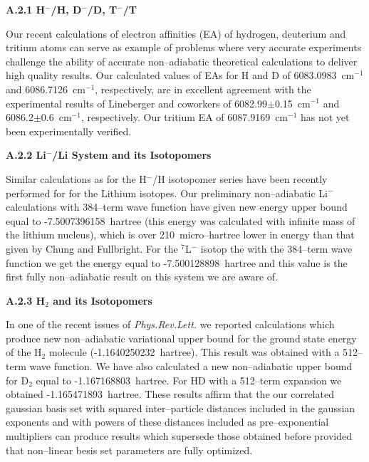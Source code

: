 \vspace{2mm}
{\bf A.2.1 H$^-$/H, D$^-$/D, T$^-$/T

Our recent calculations of electron affinities (EA) of hydrogen, deuterium
and tritium atoms \cite{A37} can serve as example of 
problems where very accurate experiments challenge the ability
of accurate non--adiabatic theoretical calculations 
to deliver high quality results.
Our calculated values of EAs for H and D of 6083.0983~cm$^{-1}$
and 6086.7126~cm$^{-1}$, respectively, are in excellent
agreement with the experimental results of Lineberger and
coworkers of 6082.99$\pm$0.15~cm$^{-1}$ and 6086.2$\pm$0.6~cm$^{-1}$,
respectively. Our tritium EA of 6087.9169~cm$^{-1}$ has not yet 
been experimentally verified. 


\vspace{2mm}
{\bf A.2.2 Li$^-$/Li System and its Isotopomers} 



Similar calculations as for the H$^-$/H isotopomer series
have been recently performed for  
for the Lithium isotopes.
Our preliminary non--adiabatic 
Li$^-$ calculations 
with 384--term wave function
have given new energy upper bound equal to
-7.5007396158~hartree (this energy was calculated
with infinite mass of the lithium nucleus), which is
over 210~micro--hartree lower in energy than that
given by Chung and Fullbright.\cite{Chung92} 
For the $^7$L$^-$ isotop the with the 384--term wave function
we get the energy equal to -7.500128898~hartree and this value 
is the first fully non--adiabatic result on this system we 
are aware of. 


\vspace{2mm}
{\bf A.2.3 H$_2$ and its Isotopomers}

In one of the recent issues of {\em Phys.Rev.Lett.}\cite{ad1} 
we reported calculations which produce new non--adiabatic
variational upper bound for the ground state energy of
the H$_2$ molecule (-1.1640250232~hartree). This result
was obtained with a 512--term wave function.
We have also calculated a new non--adiabatic upper bound
for D$_2$ equal to  -1.167168803~hartree.
For HD with a 512--term expansion we obtained -1.165471893~hartree.
These results affirm that the our correlated gaussian
basis set with squared inter--particle distances included in the
gaussian exponents and with powers of these distances included
as pre--exponential multipliers can produce results 
which supersede those obtained before provided that 
non--linear besis set parameters are fully optimized.

}
